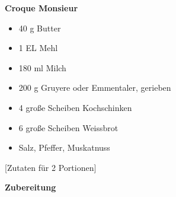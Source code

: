 

 

\parindent0pt 

 
\pagestyle{empty}


 

\textbf{{\LARGE Croque Monsieur}}%

 

\hrulefill
\vspace*{\fill}
\begin{multicols}{2} 

 

 

\begin{itemize}
\item 40 g Butter
\item 1 EL Mehl
\item 180 ml Milch
\item 200 g Gruyere oder Emmentaler, gerieben \newline
\item 4 große Scheiben Kochschinken
\item 6 große Scheiben Weissbrot
\item Salz, Pfeffer, Muskatnuss
\end{itemize}

\end{multicols}

\vfill %

 

\vspace{1cm}
%
\begin{center}
%
[Zutaten für 2 Portionen]%
\end{center}

 

 

\vfill
\newpage
\textbf{{\LARGE Zubereitung}}%

 

\hrulefill

